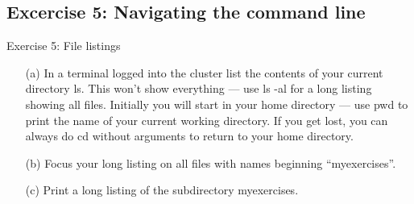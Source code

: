 \subsection{Excercise 5: Navigating the command line}
\begin{frame}{Exercise 5: File listings}
\begin{itemize}

\item[(a)]{In a terminal logged into the cluster list the contents of your current directory \alert{ls}. This won't show everything --- use \alert{ls -al} for a long listing showing all files. Initially you will start in your home directory --- use \alert{pwd} to print the name of your current working directory. If you get lost, you can always do \alert{cd} without arguments to return to your home directory.}

\item[(b)]{Focus your long listing on \alert{all files with names beginning ``myexercises''}.}

\item[(c)]{Print a long listing of the subdirectory \alert{myexercises}.}

\end{itemize}
\end{frame}








